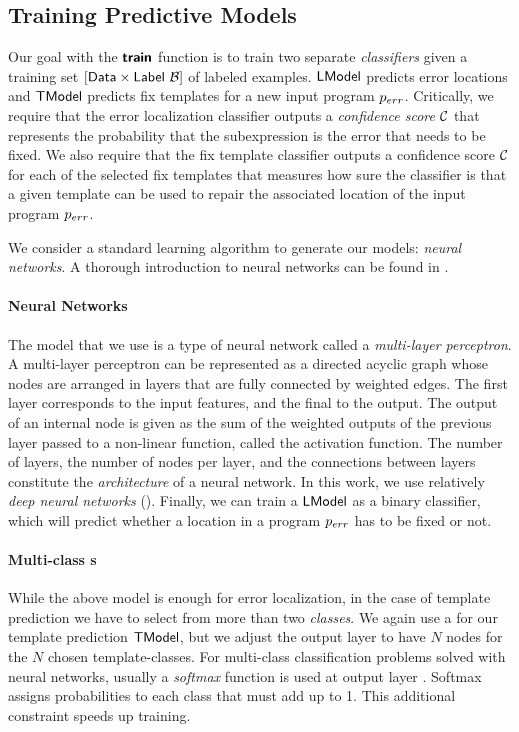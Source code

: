 \subsection{Training Predictive Models}
\label{sec:templ-pred:train}
\lstDeleteShortInline{|} %

Our goal with the $\bm{\mathsf{train}}$ function is to train two separate
\emph{classifiers} given a training set $[\mathsf{Data} \times
\mathsf{Label}\ \mathcal{B}]$ of labeled examples. $\mathsf{LModel}$ predicts error locations and
$\mathsf{TModel}$ predicts fix templates for a new input program $p_{err}$. Critically, we
require that the error localization classifier outputs a \emph{confidence score}
$\mathcal{C}$ that represents the probability that the subexpression is the error that
needs to be fixed. We also require that the fix template classifier outputs a
confidence score $\mathcal{C}$ for each of the selected fix templates that measures
how sure the classifier is that a given template can be used to repair the
associated location of the input program $p_{err}$.

We consider a standard learning algorithm to generate our models: \emph{neural
networks}. A thorough introduction to neural networks can be found in
\citep{Hastie2009-bn,Nielsen2015-pu}.

\paragraph{Neural Networks}
The model that we use is a type of neural network called a \emph{multi-layer
perceptron}. A multi-layer perceptron can be represented as a directed acyclic
graph whose nodes are arranged in layers that are fully connected by weighted
edges. The first layer corresponds to the input features, and the final to the
output. The output of an internal node is given as the sum of the weighted
outputs of the previous layer passed to a non-linear function, called the
activation function. The number of layers,
the number of nodes per layer, and the connections between layers constitute the
\emph{architecture} of a neural network. In this work, we use relatively
\emph{deep neural networks} (\dnn). Finally, we can train a \dnn $\mathsf{LModel}$ as a
binary classifier, which will predict whether a location in a program $p_{err}$
has to be fixed or not.

\paragraph{Multi-class \dnn{}s}
While the above model is enough for error localization, in the case of template
prediction we have to select from more than two \emph{classes}. We again use a
\dnn for our template prediction $\mathsf{TModel}$, but we adjust the output layer to
have $N$ nodes for the $N$ chosen template-classes. For multi-class
classification problems solved with neural networks, usually a \emph{softmax}
function is used at output layer \citep{Goodfellow-et-al-2016,Bishop-book-2006}.
Softmax assigns probabilities to each class that must add up to 1.
This additional constraint speeds up training.

